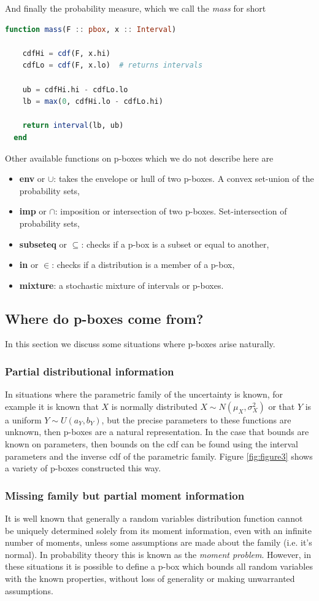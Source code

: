 \documentclass{juliacon}
\begin{document}
And finally the probability measure, which we call the \textit{mass} for short
\begin{lstlisting}[language = Julia]
  function mass(F :: pbox, x :: Interval)

    cdfHi = cdf(F, x.hi)  
    cdfLo = cdf(F, x.lo)  # returns intervals

    ub = cdfHi.hi - cdfLo.lo
    lb = max(0, cdfHi.lo - cdfLo.hi)

    return interval(lb, ub)
  end
\end{lstlisting}
\noindent Other available functions on p-boxes which we do not describe here are
\begin{itemize}
  \item \textbf{env} or $\cup$: takes the envelope or hull of two p-boxes. A convex set-union of the probability sets,
  \item \textbf{imp} or $\cap$: imposition or intersection of two p-boxes. Set-intersection of probability sets,
  \item \textbf{subseteq} or $\subseteq$: checks if a p-box is a subset or equal to another,
  \item \textbf{in} or $\in$: checks if a distribution is a member of a p-box,
  \item \textbf{mixture}: a stochastic mixture of intervals or p-boxes.
\end{itemize}
\subsection{Where do p-boxes come from?}
\noindent In this section we discuss some situations where p-boxes arise naturally.
\subsubsection{Partial distributional information}
In situations where the parametric family of the uncertainty is known, for example it is known that $X$ is normally distributed $X \sim N(\mu_{X}, \sigma_{X}^{2})$ or that $Y$ is a uniform $Y \sim U(a_{Y},b_{Y})$, but the precise parameters to these functions are unknown, then p-boxes are a natural representation. In the case that bounds are known on parameters, then bounds on the cdf can be found using the interval parameters and the inverse cdf of the parametric family. Figure \ref{fig:figure3} shows a variety of p-boxes constructed this way.
\subsubsection{Missing family but partial moment information}
\label{section:Moments}
It is well known that generally a random variables distribution function cannot be uniquely determined solely from its moment information, even with an infinite number of moments, unless some assumptions are made about the family (i.e. it's normal). In probability theory this is known as the \textit{moment problem}. However, in these situations it is possible to define a p-box which bounds all random variables with the known properties, without loss of generality or making unwarranted assumptions.
\end{document}
